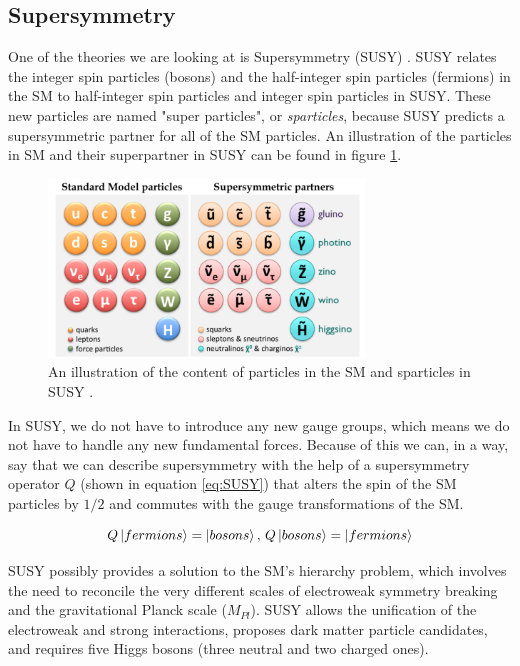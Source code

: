 \subsection{Supersymmetry}
\label{sec:SUSY}
One of the theories we are looking at is Supersymmetry (SUSY) \cite{sleptonexclusion}. SUSY relates the integer spin particles (bosons) and the half-integer spin particles (fermions) in the SM to half-integer spin particles and integer spin particles in SUSY. These new particles are named "super particles", or \textit{sparticles}, because SUSY predicts a supersymmetric partner for all of the SM particles. An illustration of the particles in SM and their superpartner in SUSY can be found in figure \ref{fig:smandsusy}.

\begin{figure}[H]
    \centering
    \includegraphics[width = 0.75\textwidth]{Figures/FromOnline/susy_particles.png}
    \caption{An illustration of the content of particles in the SM and sparticles in SUSY \cite{SUSYpic}.}
    \label{fig:smandsusy}
\end{figure}

In SUSY, we do not have to introduce any new gauge groups, which means we do not have to handle any new fundamental forces. Because of this we can, in a way, say that we can describe supersymmetry with the help of a supersymmetry operator $Q$ (shown in equation \ref{eq:SUSY}) that alters the spin of the SM particles by $1/2$ and commutes with the gauge transformations of the SM. 

\begin{equation}
    \label{eq:SUSY}
    Q\ket{fermions} = \ket{bosons} \text{,   }  Q\ket{bosons} =\ket{fermions}
\end{equation}

SUSY possibly provides a solution to the SM's hierarchy problem, which involves the need to reconcile the very different scales of electroweak symmetry breaking and the gravitational Planck scale ($M_{Pl}$). SUSY allows the unification of the electroweak and strong interactions, proposes dark matter particle candidates, and requires five Higgs bosons (three neutral and two charged ones). 




